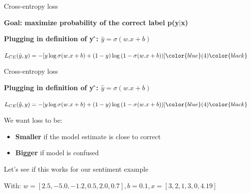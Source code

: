 \documentclass[13.5pt,aspecratio=169]{beamer}
\begin{document}
\begin{frame}{Cross-entropy loss}
    \begin{block}{\large \textbf{Goal: maximize probability of the correct label p(y$|$x) }}
    \end{block}
    \begin{block}{\textbf{Plugging in definition of y ̂: {$\hat{y} = \sigma(w.x+b)$ }}}
        \centerline{$L_{CE} (\hat{y},y) = - [y \log{\sigma(w.x+b) }+(1-y)\log{(1-\sigma(w.x+b))}]\color{blue} (4) \color{black}$}     
    \end{block}
\end{frame}
\begin{frame}{Cross-entropy loss}
    \begin{block}{\textbf{Plugging in definition of y ̂: {$\hat{y} = \sigma(w.x+b)$ }}}
        \centerline{$L_{CE} (\hat{y},y) = - [y \log{\sigma(w.x+b) }+(1-y)\log{(1-\sigma(w.x+b))}]\color{blue} (4) \color{black}$}     
    \end{block}
    \begin{block}{We want loss to be:}
        \begin{itemize}
            \item \textbf{Smaller} if the model estimate is close to correct
            \item \textbf{Bigger} if model is confused
        \end{itemize}
    \end{block}
\end{frame}
\begin{frame}{Let's see if this works for our sentiment example}
    \begin{exampleblock}{With:}
        $ w = [2.5,−5.0,−1.2,0.5,2.0,0.7], b = 0.1, x = [3,2,1,3,0,4.19]$
    \end{exampleblock}
\end{frame}
\end{document}
